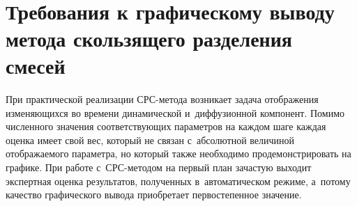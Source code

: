 \begin{multicols}{2}
\begin{figure*}[b] %
\vspace*{1pt}
 \begin{center}
 \mbox{%
 \epsfxsize=134.5mm
 }
 \end{center}
 \vspace*{-9pt}
\label{Init}
\end{figure*}


\section{Требования к графическому выводу метода скользящего разделения смесей}

При практической реализации СРС-ме\-то\-да возникает задача
отображения изменяющихся во времени
динамической и~диффузионной компонент. Помимо численного значения соответствующих параметров на
каждом шаге каждая оценка имеет свой вес, который не связан с~абсолютной величиной отображаемого
параметра, но который также необходимо продемонстрировать на графике.
При работе с~СРС-методом
на первый план зачастую выходит экспертная оценка результатов,
полученных в~автоматическом режиме, а~потому качество графического вывода приобретает первостепенное
значение.


\end{multicols}
